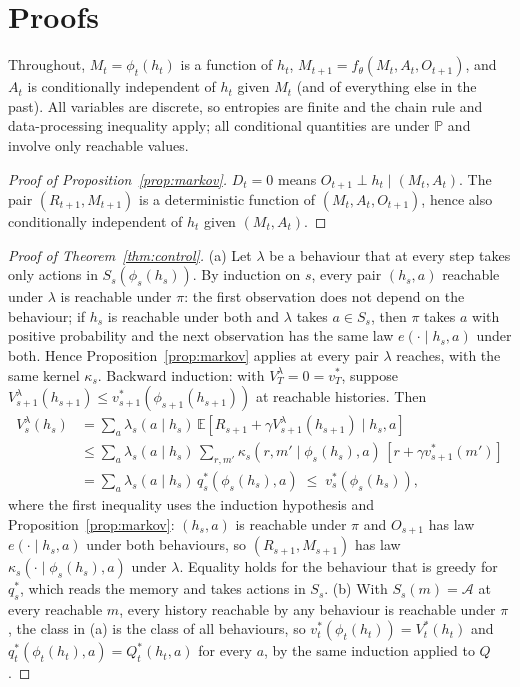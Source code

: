 \documentclass[11pt]{article}
\theoremstyle{plain}
\theoremstyle{definition}
\theoremstyle{remark}
\newcommand{\E}{\mathbb{E}}
\newcommand{\PP}{\mathbb{P}}
\newcommand{\calA}{\mathcal{A}}
\begin{document}
\section{Proofs}\label{app:proofs}
Throughout, $M_t = \phi_t(h_t)$ is a function of $h_t$, $M_{t+1} = f_\theta(M_t, A_t, O_{t+1})$, and $A_t$ is conditionally independent of $h_t$ given $M_t$ (and of everything else in the past). All variables are discrete, so entropies are finite and the chain rule and data-processing inequality apply; all conditional quantities are under $\PP$ and involve only reachable values.

\begin{proof}[Proof of Proposition~\ref{prop:markov}]
$D_t = 0$ means $O_{t+1} \perp h_t \mid (M_t, A_t)$. The pair $(R_{t+1}, M_{t+1})$ is a deterministic function of $(M_t, A_t, O_{t+1})$, hence also conditionally independent of $h_t$ given $(M_t, A_t)$.
\end{proof}

\begin{proof}[Proof of Theorem~\ref{thm:control}]
(a) Let $\lambda$ be a behaviour that at every step takes only actions in $S_s(\phi_s(h_s))$. By induction on $s$, every pair $(h_s, a)$ reachable under $\lambda$ is reachable under $\pi$: the first observation does not depend on the behaviour; if $h_s$ is reachable under both and $\lambda$ takes $a \in S_s$, then $\pi$ takes $a$ with positive probability and the next observation has the same law $e(\cdot \mid h_s, a)$ under both. Hence Proposition~\ref{prop:markov} applies at every pair $\lambda$ reaches, with the same kernel $\kappa_s$. Backward induction: with $V^\lambda_T = 0 = v^*_T$, suppose $V^\lambda_{s+1}(h_{s+1}) \le v^*_{s+1}(\phi_{s+1}(h_{s+1}))$ at reachable histories. Then
\begin{align*}
V^\lambda_s(h_s) &= \sum_a \lambda_s(a \mid h_s)\, \E[R_{s+1} + \gamma V^\lambda_{s+1}(h_{s+1}) \mid h_s, a] \\
&\le \sum_a \lambda_s(a \mid h_s)\, \sum_{r, m'} \kappa_s(r, m' \mid \phi_s(h_s), a)\,[r + \gamma v^*_{s+1}(m')] \\
&= \sum_a \lambda_s(a \mid h_s)\, q^*_s(\phi_s(h_s), a) \;\le\; v^*_s(\phi_s(h_s)),
\end{align*}
where the first inequality uses the induction hypothesis and Proposition~\ref{prop:markov}: $(h_s, a)$ is reachable under $\pi$ and $O_{s+1}$ has law $e(\cdot \mid h_s, a)$ under both behaviours, so $(R_{s+1}, M_{s+1})$ has law $\kappa_s(\cdot \mid \phi_s(h_s), a)$ under $\lambda$. Equality holds for the behaviour that is greedy for $q^*_s$, which reads the memory and takes actions in $S_s$. (b) With $S_s(m) = \calA$ at every reachable $m$, every history reachable by any behaviour is reachable under $\pi$, the class in (a) is the class of all behaviours, so $v^*_t(\phi_t(h_t)) = V^*_t(h_t)$ and $q^*_t(\phi_t(h_t), a) = Q^*_t(h_t, a)$ for every $a$, by the same induction applied to $Q$.
\end{proof}
\end{document}
